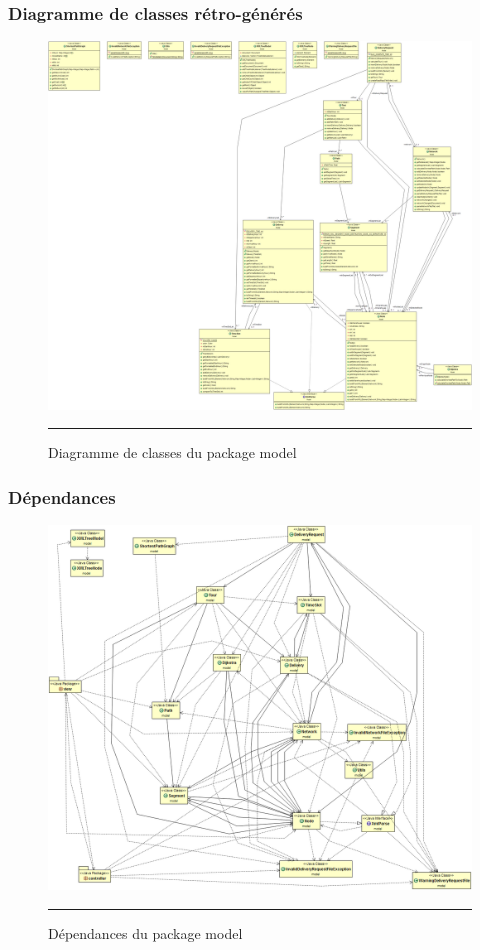 \subsubsection{Diagramme de classes rétro-générés}
\begin{figure}[H]
	\centering
		\includegraphics[width=\textwidth,height=\textheight,keepaspectratio]{Figures/retro_model}
		\rule{35em}{0.5pt}
	\caption[Diagramme de classes du package model]{Diagramme de classes du package model}
\end{figure}
\subsubsection{Dépendances}
\begin{figure}[H]
	\centering
		\includegraphics[width=\textwidth,height=\textheight,keepaspectratio]{Figures/retro_model_dep}
		\rule{35em}{0.5pt}
	\caption[Dépendances du package model]{Dépendances du package model}
\end{figure}

